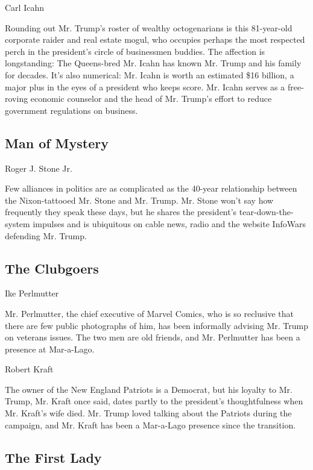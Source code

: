 Carl Icahn

Rounding out Mr. Trump's roster of wealthy octogenarians is this
81-year-old corporate raider and real estate mogul, who occupies perhaps
the most respected perch in the president's circle of businessmen
buddies. The affection is longstanding: The Queens-bred Mr. Icahn has
known Mr. Trump and his family for decades. It's also numerical: Mr.
Icahn is worth an estimated \$16 billion, a major plus in the eyes of a
president who keeps score. Mr. Icahn serves as a free-roving economic
counselor and the head of Mr. Trump's effort to reduce government
regulations on business.

\hypertarget{man-of-mystery}{%
\subsection{Man of Mystery}\label{man-of-mystery}}

Roger J. Stone Jr.

Few alliances in politics are as complicated as the 40-year relationship
between the Nixon-tattooed Mr. Stone and Mr. Trump. Mr. Stone won't say
how frequently they speak these days, but he shares the president's
tear-down-the-system impulses and is ubiquitous on cable news, radio and
the website InfoWars defending Mr. Trump.

\hypertarget{the-clubgoers}{%
\subsection{The Clubgoers}\label{the-clubgoers}}

Ike Perlmutter

Mr. Perlmutter, the chief executive of Marvel Comics, who is so
reclusive that there are few public photographs of him, has been
informally advising Mr. Trump on veterans issues. The two men are old
friends, and Mr. Perlmutter has been a presence at Mar-a-Lago.

Robert Kraft

The owner of the New England Patriots is a Democrat, but his loyalty to
Mr. Trump, Mr. Kraft once said, dates partly to the president's
thoughtfulness when Mr. Kraft's wife died. Mr. Trump loved talking about
the Patriots during the campaign, and Mr. Kraft has been a Mar-a-Lago
presence since the transition.

\hypertarget{the-first-lady}{%
\subsection{The First Lady}\label{the-first-lady}}

